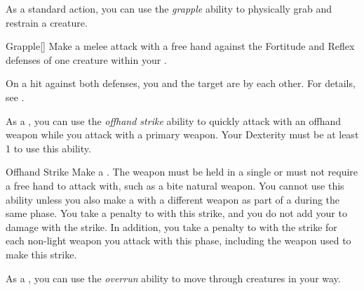         \label{Grapple} As a standard action, you can use the \textit{grapple} ability to physically grab and restrain a creature.

        \begin{activeability}{Grapple}[]
            \rankline
            Make a melee attack with a free hand against the Fortitude and Reflex defenses of one creature within your .

            On a hit against both defenses, you and the target are \grappled by each other.
            For details, see .
        \end{activeability}

        \label{Offhand Strike} As a , you can use the \textit{offhand strike} ability to quickly attack with an offhand weapon while you attack with a primary weapon.
        Your Dexterity must be at least 1 to use this ability.
        \begin{activeability}{Offhand Strike}
            \rankline
            Make a .
            The weapon must be held in a single  or must not require a free hand to attack with, such as a bite natural weapon.
            You cannot use this ability unless you also make a  with a different weapon as part of a  during the same phase.
            You take a  penalty to  with this strike, and you do not add your  to damage with the strike.
            In addition, you take a  penalty to  with the strike for each non-light weapon you attack with this phase, including the weapon used to make this strike.
        \end{activeability}

        \label{Overrun} As a , you can use the \textit{overrun} ability to move through creatures in your way.

